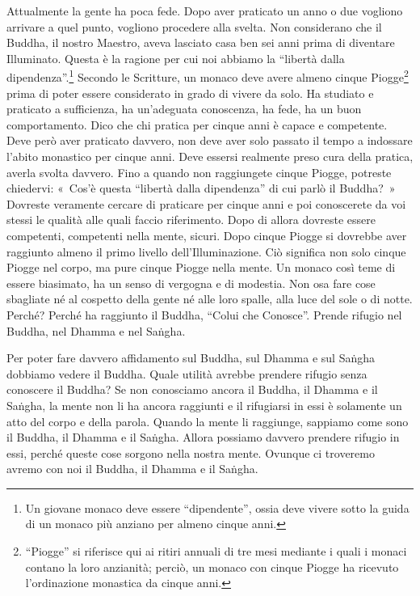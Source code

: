 Attualmente la gente ha poca fede. Dopo aver praticato un anno o due
vogliono arrivare a quel punto, vogliono procedere alla svelta. Non
considerano che il Buddha, il nostro Maestro, aveva lasciato casa ben
sei anni prima di diventare Illuminato. Questa è la ragione per cui noi
abbiamo la ``libertà dalla dipendenza''.\footnote{Un giovane monaco deve
  essere ``dipendente'', ossia deve vivere sotto la guida di un monaco
  più anziano per almeno cinque anni.} Secondo le Scritture, un monaco
deve avere almeno cinque Piogge\footnote{``Piogge'' si riferisce qui ai
  ritiri annuali di tre mesi mediante i quali i monaci contano la loro
  anzianità; perciò, un monaco con cinque Piogge ha ricevuto
  l'ordinazione monastica da cinque anni.} prima di poter essere
considerato in grado di vivere da solo. Ha studiato e praticato a
sufficienza, ha un'adeguata conoscenza, ha fede, ha un buon
comportamento. Dico che chi pratica per cinque anni è capace e
competente. Deve però aver praticato davvero, non deve aver solo passato
il tempo a indossare l'abito monastico per cinque anni. Deve essersi
realmente preso cura della pratica, averla svolta davvero. Fino a quando
non raggiungete cinque Piogge, potreste chiedervi: «~Cos'è questa
``libertà dalla dipendenza'' di cui parlò il Buddha?~» Dovreste
veramente cercare di praticare per cinque anni e poi conoscerete da voi
stessi le qualità alle quali faccio riferimento. Dopo di allora dovreste
essere competenti, competenti nella mente, sicuri. Dopo cinque Piogge si
dovrebbe aver raggiunto almeno il primo livello dell'Illuminazione. Ciò
significa non solo cinque Piogge nel corpo, ma pure cinque Piogge nella
mente. Un monaco così teme di essere biasimato, ha un senso di vergogna
e di modestia. Non osa fare cose sbagliate né al cospetto della gente né
alle loro spalle, alla luce del sole o di notte. Perché? Perché ha
raggiunto il Buddha, ``Colui che Conosce''. Prende rifugio nel Buddha,
nel Dhamma e nel Saṅgha.

Per poter fare davvero affidamento sul Buddha, sul Dhamma e sul Saṅgha
dobbiamo vedere il Buddha. Quale utilità avrebbe prendere rifugio senza
conoscere il Buddha? Se non conosciamo ancora il Buddha, il Dhamma e il
Saṅgha, la mente non li ha ancora raggiunti e il rifugiarsi in essi è
solamente un atto del corpo e della parola. Quando la mente li
raggiunge, sappiamo come sono il Buddha, il Dhamma e il Saṅgha. Allora
possiamo davvero prendere rifugio in essi, perché queste cose sorgono
nella nostra mente. Ovunque ci troveremo avremo con noi il Buddha, il
Dhamma e il Saṅgha.

